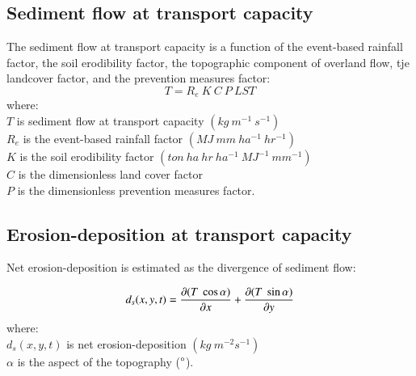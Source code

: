 \documentclass[final,3p,times,twocolumn]{elsarticle}
\begin{document}
\subsection{Sediment flow at transport capacity} 
The sediment flow at transport capacity is a function of 
the event-based rainfall factor, the soil erodibility factor, 
the topographic component of overland flow,
tje landcover factor, and the prevention measures factor:
%
\begin{equation}
\label{eq:usped}
{T = R_e ~ K ~ C ~ P ~ LST}
\end{equation}
%
{\small
\noindent
where: \\
\noindent
\hspace*{0.5em} $T$ is sediment flow at transport capacity $(kg ~ m^{-1} ~ s^{-1})$\\ 
\hspace*{0.5em} $R_e$ is the event-based rainfall factor $(MJ ~ mm ~ ha^{-1} ~ hr^{-1})$\\
\hspace*{0.5em} $K$ is the soil erodibility factor $(ton ~ ha ~ hr ~ ha^{-1} ~ MJ^{-1} ~ mm^{-1})$\\ %
\hspace*{0.5em} $C$ is the dimensionless land cover factor\\
\hspace*{0.5em} $P$ is the dimensionless prevention measures factor.\\
}

\subsection{Erosion-deposition at transport capacity}
Net erosion-deposition is estimated as the divergence of sediment flow: 

\begin{equation}\label{eq:usped_erdep} 
d_s(x,y,t) = 
{\partial (T ~ \cos \alpha) \over \partial x} +
{\partial (T ~ \sin \alpha) \over \partial y}
\end{equation}
%
{\small
\noindent
where: \\
\hspace*{0.5em} $d_s(x,y,t)$ is net erosion-deposition $(kg ~ m^{-2} s^{-1})$\\
\hspace*{0.5em} $\alpha$ is the aspect of the topography ($\degree$).\\
}
\end{document}
